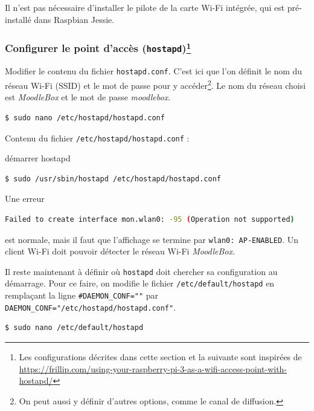 \documentclass[11pt]{article}
\begin{document}
Il n'est pas nécessaire d'installer le pilote de la carte Wi-Fi intégrée, qui est pré-installé dans Raspbian Jessie.

\subsubsection[Configurer le point d'accès (\lstinline{hostapd})]{Configurer le point d'accès (\lstinline{hostapd})\footnote{Les configurations décrites dans cette section et la suivante sont inspirées de \url{https://frillip.com/using-your-raspberry-pi-3-as-a-wifi-access-point-with-hostapd/}}}

Modifier le contenu du fichier \lstinline{hostapd.conf}. C'est ici que l'on définit le nom du réseau Wi-Fi (SSID) et le mot de passe pour y accéder\footnote{On peut aussi y définir d'autres options, comme le canal de diffusion.}. Le nom du réseau choisi est \emph{MoodleBox} et le mot de passe \emph{moodlebox}.

\begin{lstlisting}[language=bash]
$ sudo nano /etc/hostapd/hostapd.conf
\end{lstlisting}

Contenu du fichier \lstinline{/etc/hostapd/hostapd.conf} :



\begin{verification}
démarrer hostapd
\begin{lstlisting}[language=bash]
$ sudo /usr/sbin/hostapd /etc/hostapd/hostapd.conf
\end{lstlisting}

Une erreur
\begin{lstlisting}[language=bash]
Failed to create interface mon.wlan0: -95 (Operation not supported)
\end{lstlisting}
est normale, mais il faut que l'affichage se termine par \lstinline{wlan0: AP-ENABLED}. Un client Wi-Fi doit pouvoir détecter le réseau Wi-Fi \emph{MoodleBox}.
\end{verification}


Il reste maintenant à définir où \lstinline{hostapd} doit chercher sa configuration au démarrage. Pour ce faire, on modifie le fichier \lstinline{/etc/default/hostapd} en remplaçant la ligne \lstinline{#DAEMON_CONF=""} par \lstinline{DAEMON_CONF="/etc/hostapd/hostapd.conf"}.

\begin{lstlisting}[language=bash]
$ sudo nano /etc/default/hostapd
\end{lstlisting}
\end{document}

